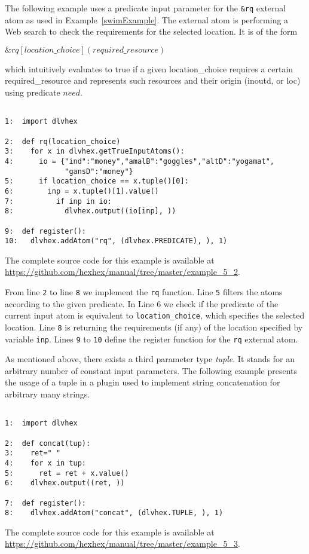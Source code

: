 \documentclass[a4paper, titlepage]{article}
\newcommand{\ext}[3]{\ensuremath{\&{\mathit{#1}}[#2](#3)}}
\newcommand{\examplelink}[1]{\url{https://github.com/hexhex/manual/tree/master/#1}}
\newcommand\mycenterline[1]{\par\smallskip\centerline{#1} \smallskip}
\begin{document}
The following example uses a predicate input parameter 
for the \verb+&rq+ external atom as used in Example~\ref{swimExample}. The external atom is performing 
a Web search to check the requirements for the selected location. It is of the form 
%
\mycenterline{$\ext{\mathit{rq}}{\mathit{location\_choice}}
{\mathit{required\_resource}}$}
% 
which intuitively evaluates 
to true if a given location\_choice requires a certain 
required\_resource and represents such resources and their 
origin (inoutd, or loc) using predicate $\mathit{need}$. 
\begin{exmp}
\label{predicateAsInput}
\begin{verbatim}

1:  import dlvhex 

2:  def rq(location_choice)
3:    for x in dlvhex.getTrueInputAtoms():
4:      io = {"ind":"money","amalB":"goggles","altD":"yogamat",
              "gansD":"money"}
5:      if location_choice == x.tuple()[0]:
6:        inp = x.tuple()[1].value()
7:          if inp in io:
8:            dlvhex.output((io[inp], ))

9:  def register():
10:   dlvhex.addAtom("rq", (dlvhex.PREDICATE), ), 1)
\end{verbatim}
\end{exmp}
The complete source code for this example is available at \examplelink{example_5_2}.

From line \verb+2+ to line \verb+8+ we implement the \verb+rq+ function. Line \verb+5+ filters the atoms according to the given predicate. In Line 6 we check if the predicate of the current input atom is equivalent to \texttt{location\_choice}, which specifies the selected location. Line \verb+8+ is returning  
the requirements (if any) of the location specified by variable 
\verb+inp+. Lines \verb+9+ to \verb+10+ define the register 
function for the \verb+rq+ external atom.

As mentioned above, there exists a third parameter type \emph{tuple}. It stands for an arbitrary number of constant input parameters. The following example presents the usage of a tuple in a plugin used to implement string concatenation for arbitrary many strings.  
\begin{exmp}
\label{tupleAsInput}
\begin{verbatim}

1:  import dlvhex

2:  def concat(tup):
3:    ret=" "
4:    for x in tup:
5:      ret = ret + x.value()
6:    dlvhex.output((ret, ))

7:  def register():
8:    dlvhex.addAtom("concat", (dlvhex.TUPLE, ), 1)
\end{verbatim}
\end{exmp}
The complete source code for this example is available at \examplelink{example_5_3}.
\end{document}
